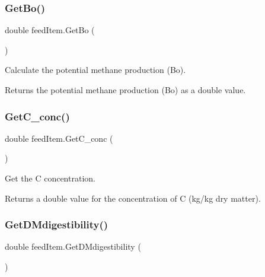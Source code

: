 \subsubsection{\texorpdfstring{GetBo()}{GetBo()}}
{\footnotesize\ttfamily double feed\+Item.\+Get\+Bo (\begin{DoxyParamCaption}{ }\end{DoxyParamCaption})\hspace{0.3cm}{\ttfamily [inline]}}



Calculate the potential methane production (Bo). 

\begin{DoxyReturn}{Returns}
the potential methane production (Bo) as a double value. 
\end{DoxyReturn}
\mbox{\label{classfeed_item_a9661e73c167e27fd0e1b78fbb9bbe9bc}} 
\subsubsection{\texorpdfstring{GetC\_conc()}{GetC\_conc()}}
{\footnotesize\ttfamily double feed\+Item.\+Get\+C\+\_\+conc (\begin{DoxyParamCaption}{ }\end{DoxyParamCaption})\hspace{0.3cm}{\ttfamily [inline]}}



Get the C concentration. 

\begin{DoxyReturn}{Returns}
a double value for the concentration of C (kg/kg dry matter). 
\end{DoxyReturn}
\mbox{\label{classfeed_item_a1d4a479d20f0a6796825b6a9369b04d7}} 
\subsubsection{\texorpdfstring{GetDMdigestibility()}{GetDMdigestibility()}}
{\footnotesize\ttfamily double feed\+Item.\+Get\+D\+Mdigestibility (\begin{DoxyParamCaption}{ }\end{DoxyParamCaption})\hspace{0.3cm}{\ttfamily [inline]}}



